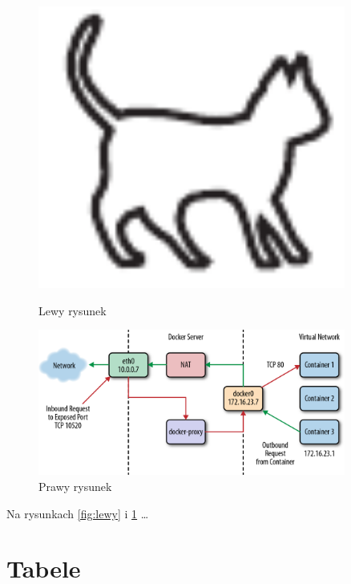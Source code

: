 \begin{figure}[ht]
	\centering
	\begin{minipage}[b]{0.45\textwidth}
		\centering\includegraphics[width=0.9\textwidth]{chapters/chapter1/imgs/kotek.pdf} %
		\caption{Lewy rysunek}\label{fig:lewy}
	\end{minipage}
	\begin{minipage}[b]{0.45\textwidth}
		\centering
		\includegraphics[width=0.9\textwidth]{chapters/chapter1/imgs/swarm-network.png} %
		\caption{Prawy rysunek}\label{fig:prawy}
	\end{minipage}
\end{figure}

Na rysunkach \ref{fig:lewy} i \ref{fig:prawy} \dots


\section{Tabele}

